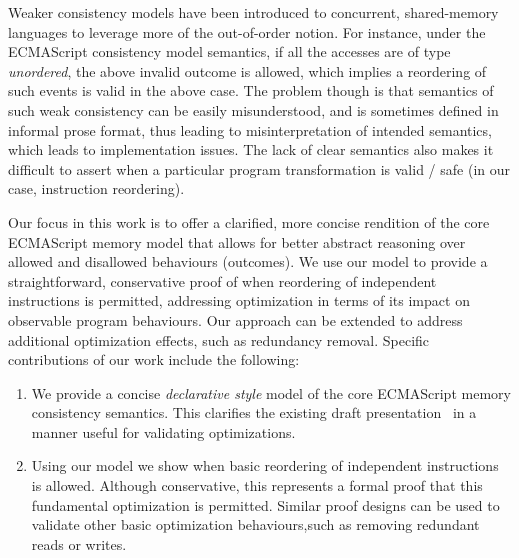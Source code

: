     
    Weaker consistency models have been introduced to concurrent, shared-memory languages to leverage more of the \textit{}{out-of-order} notion. 
    For instance,  under the ECMAScript consistency model semantics, if all the accesses are of type \textit{unordered}, the above invalid outcome is allowed, which implies a reordering of such events is valid in the above case. 
    The problem though is that semantics of such weak consistency can be easily misunderstood, and is sometimes defined in informal prose format, thus leading to misinterpretation of intended semantics, which leads to implementation issues. 
    The lack of clear semantics also makes it difficult to assert when a particular program transformation is valid / safe (in our case, instruction reordering).
    
    Our focus in this work is to offer a clarified, more concise rendition of the core ECMAScript memory model that allows for better abstract reasoning over allowed and disallowed behaviours (outcomes). 
    We use our model to provide a straightforward, conservative proof of when reordering of independent instructions is permitted, addressing optimization in terms of its impact on observable program behaviours. 
    Our approach can be extended to address additional optimization effects, such as redundancy removal. Specific contributions of our work include the following:
    
    \begin{enumerate}
        \item We provide a concise \textit{declarative style} model of the core ECMAScript memory consistency semantics. This clarifies the existing draft presentation~\cite{ECMA} in a manner useful for validating optimizations.
        \item Using our model we show when basic reordering of independent instructions is allowed. Although conservative, this represents a formal proof that this fundamental optimization is permitted. Similar proof designs can be used to validate other basic optimization behaviours,such as removing redundant reads or writes.
    \end{enumerate}
  